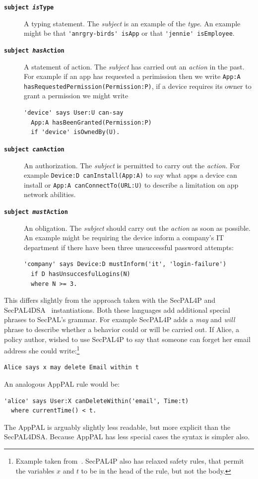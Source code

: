 \documentclass[thesis.tex]{subfiles}
\begin{document}
\begin{description}
\item[\bfseries\texttt{subject \emph{is}Type}]
  A typing statement.  The \emph{subject} is an example of the \emph{type}.  An
  example might be that \lstinline!'anrgry-birds' isApp! or that
  \lstinline!'jennie' isEmployee!.
\item[\bfseries\texttt{subject \emph{has}Action}]
  A statement of action.  The \emph{subject} has carried out an \emph{action} in
  the past. For example if an app has requested a perimission then we write
  \lstinline!App:A hasRequestedPermission(Permission:P)!, if a device requires
  its owner to grant a permission we might write
  \begin{lstlisting}
'device' says User:U can-say
  App:A hasBeenGranted(Permission:P)
  if 'device' isOwnedBy(U).
  \end{lstlisting}
\item[\bfseries\texttt{subject \emph{can}Action}]
  An authorization. The \emph{subject} is permitted to carry out the \emph{action}.
  For example \lstinline!Device:D canInstall(App:A)! to say what apps a device
  can install or \lstinline!App:A canConnectTo(URL:U)! to describe a limitation
  on app network abilities.
\item[\bfseries\texttt{subject \emph{must}Action}]
  An obligation.  The \emph{subject} should carry out the \emph{action} as soon
  as possible.
  An example might be requiring the device inform a company's IT department if
  there have been three unsuccessful password attempts:
  \begin{lstlisting}
'company' says Device:D mustInform('it', 'login-failure')
  if D hasUnsuccesfulLogins(N)
  where N >= 3.
  \end{lstlisting}
\end{description}

This differs slightly from the approach taken with the SecPAL4P and SecPAL4DSA~\cite{becker_framework_????,aziz_secpal4dsa:_2011} instantiations.
Both these languages add additional special phrases to SecPAL's grammar.
For example SecPAL4P adds a \emph{may} and \emph{will} phrase to describe whether a behavior could or will be carried out.
If Alice, a policy author, wished to use SecPAL4P to say that someone can forget her email address she could write:\footnote{%
  Example taken from~\cite{becker_framework_????}.  SecPAL4P also has relaxed safety rules, that permit the variables $x$ and $t$ to be in the head of the rule, but not the body.}
\begin{lstlisting}
Alice says x may delete Email within t
\end{lstlisting}
An analogous AppPAL rule would be:
\begin{lstlisting}
'alice' says User:X canDeleteWithin('email', Time:t)
  where currentTime() < t.
\end{lstlisting}
The AppPAL is arguably slightly less readable, but more explicit than the SecPAL4DSA.
Because AppPAL has less special cases the syntax is simpler also.
\end{document}
